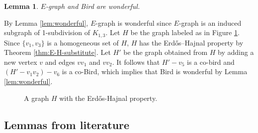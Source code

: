 \documentclass[a4paper,11pt]{article}
\newtheorem{lemma}[theorem]{Lemma}
\let\oldendproof\endproof
\renewenvironment{proof}[1][\proofname]{%
	\oldproof[\normalfont\bfseries #1]%
}{\oldendproof}
\begin{document}
\begin{lemma}\label{lem:E and Bird are wonderful}
    $E$-graph and Bird are wonderful. 
\end{lemma}
\begin{proof}
    By Lemma \ref{lem:wonderful}, $E$-graph is wonderful since $E$-graph is an induced subgraph of 1-subdivision of $K_{1,3}$. 
    Let $H$ be the graph labeled as in Figure \ref{fig:H}. 
    Since $\{v_1,v_3\}$ is a homogeneous set of $H$, $H$  has the Erd\H{o}s–Hajnal property by Theorem \ref{thm:E-H-substitute}. 
    Let $H'$ be the graph obtained from $H$ by adding a new vertex $v$ and edges $vv_1$ and $vv_2$. It follows that $H'-v_5$ is a co-bird and $(H'-v_1v_2)-v_6$ is a co-Bird, which implies that Bird is wonderful by Lemma \ref{lem:wonderful}.
\end{proof}
\begin{figure}[h!]
        \centering
        \caption{A graph $H$ with the Erd\H{o}s-Hajnal property.}
        \label{fig:H}
    \end{figure}

\subsection{Lemmas from literature}
\end{document}
